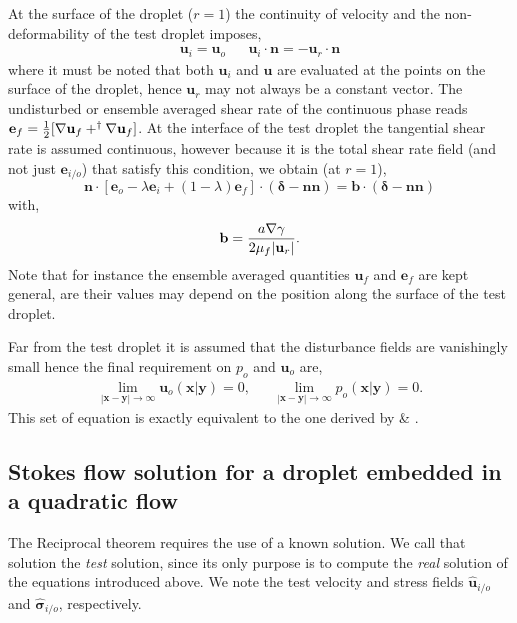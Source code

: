 At the surface of the droplet ($r = 1$) the continuity of velocity and the non-deformability of the test droplet imposes, 
\begin{align}
    \textbf{u}_{i} = \textbf{u}_{o}
    && 
    \textbf{u}_{i} \cdot \textbf{n}
    =
    - \textbf{u}_r \cdot \textbf{n}
    \label{eq:normal_vel}
\end{align}
where it must be noted that both $\textbf{u}_{i}$ and $\textbf{u}$ are evaluated at the points on the surface of the droplet, hence $\textbf{u}_r$ may not always be a constant vector. 
The undisturbed or ensemble averaged shear rate of the continuous phase reads  $\textbf{e}_f =\frac{1}{2} [\mathbf{\nabla} \textbf{u}_f + ^\dagger \mathbf{\nabla} \textbf{u}_f]$. 
At the interface of the test droplet the tangential shear rate is assumed continuous, however because it is the total shear rate field (and not just $\textbf{e}_{i/o}$) that satisfy this condition, we obtain (at $r=1$),
\begin{equation}
    \mathbf{n}\cdot [\textbf{e}_{o} - \lambda \textbf{e}_{i} + (1-\lambda)\textbf{e}_f
    ]\cdot (\bm\delta - \textbf{nn})
    =
    \textbf{b}\cdot (\bm\delta - \textbf{nn})
    \label{eq:boundary_cdt_stress}
\end{equation}
with, 
\begin{equation}
    \textbf{b}
    =
    \frac{a \mathbf{\nabla} \gamma}{2 \mu_f |\textbf{u}_r|}. 
\end{equation}
Note that for instance the ensemble averaged quantities $\textbf{u}_f$ and $\textbf{e}_f$ are kept general, are their values may depend on the position along the surface of the test droplet. 


Far from the test droplet it is assumed that the disturbance fields are vanishingly small hence the final requirement on $p_{o}$ and $\textbf{u}_{o}$ are, 
\begin{align*}
    \lim_{|\textbf{x}-\textbf{y}|\to\infty }\textbf{u}_{o}(\textbf{x}|\textbf{y}) = 0,
    && \lim_{|\textbf{x}-\textbf{y}|\to\infty }p_{o}(\textbf{x}|\textbf{y})= 0. 
\end{align*}
This set of equation is exactly equivalent to the one derived by \cite{maxey1983equation} \& \citet{gatignol1983faxen}. 






\subsection{Stokes flow solution for a droplet embedded in a quadratic flow}
The Reciprocal theorem requires the use of a known solution.
We call that solution the \textit{test} solution, since its only purpose is to compute the \textit{real} solution of the equations introduced above. 
We note the test velocity and stress fields $\hat{\textbf{u}}_{i/o}$ and $\hat{\bm\sigma}_{i/o}$, respectively. 

